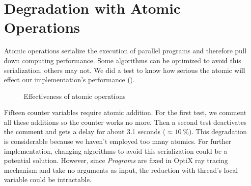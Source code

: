 \section{Degradation with Atomic Operations}
Atomic operations serialize the execution of parallel programs and therefore pull down computing performance. Some algorithms can be optimized to avoid this serialization, others may not. We did a test to know how serious the atomic will effect our implementation's performance ().
\begin{figure}
\centering
{}
\caption{Effectiveness of atomic operations}
\label{fig:ato}
\end{figure}

Fifteen counter variables require atomic addition. For the first test, we comment all these additions so the counter works no more. Then a second test deactivates the comment and gets a delay for about 3.1 seconds ($\approx 10\ \%$). This degradation is considerable because we haven't employed too many atomics. For further implementation, changing algorithms to avoid this serialization could be a potential solution. However, since \textit{Programs} are fixed in OptiX ray tracing mechanism and take no arguments as input, the reduction with thread's local variable could be intractable.

